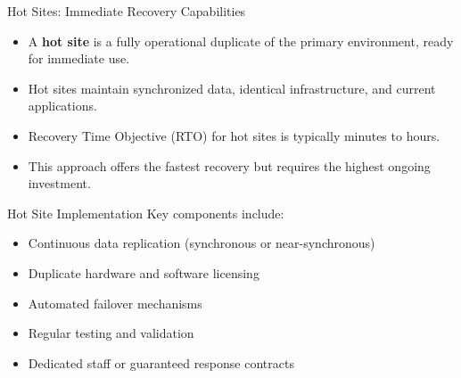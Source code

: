 \documentclass{beamer}
\begin{document}
\begin{frame}{Hot Sites: Immediate Recovery Capabilities}
    \begin{itemize}
        \item A \textbf{hot site} is a fully operational duplicate of the primary environment, ready for immediate use.
        \item Hot sites maintain synchronized data, identical infrastructure, and current applications.
        \item Recovery Time Objective (RTO) for hot sites is typically minutes to hours.
        \item This approach offers the fastest recovery but requires the highest ongoing investment.
    \end{itemize}
    
    \begin{exampleblock}{Hot Site Implementation}
        Key components include:
        \begin{itemize}
            \item Continuous data replication (synchronous or near-synchronous)
            \item Duplicate hardware and software licensing
            \item Automated failover mechanisms
            \item Regular testing and validation
            \item Dedicated staff or guaranteed response contracts
        \end{itemize}
    \end{exampleblock}
\end{frame}
\end{document}
